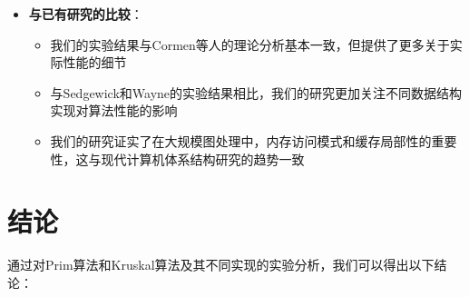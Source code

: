 \documentclass[a4paper,12pt]{ctexart}
\begin{document}
\begin{itemize}
\item \textbf{与已有研究的比较}：
\begin{itemize}
    \item 我们的实验结果与Cormen等人\cite{cormen}的理论分析基本一致，但提供了更多关于实际性能的细节
    \item 与Sedgewick和Wayne\cite{sedgewick}的实验结果相比，我们的研究更加关注不同数据结构实现对算法性能的影响
    \item 我们的研究证实了在大规模图处理中，内存访问模式和缓存局部性的重要性\cite{cache_locality}，这与现代计算机体系结构研究的趋势一致
\end{itemize}
\end{itemize}

\section{结论}
通过对Prim算法和Kruskal算法及其不同实现的实验分析，我们可以得出以下结论：
\end{document}
